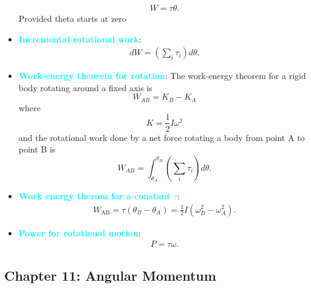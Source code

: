 \documentclass{report}
\begin{document}
\begin{itemize}
        \begin{align*}
            W = \tau\theta
        .\end{align*}
        Provided theta starts at zero
    \item \textbf{\textcolor{cyan}{Incremental rotational work}}:
        \begin{align*}
            dW = \left(\sum_i \tau_{i}\right)d\theta 
        .\end{align*}
    \item \textbf{\textcolor{cyan}{Work-energy theorem for rotation}}:
        The work-energy theorem for a rigid body rotating around a fixed axis is
        \[
            W_{AB} = K_B - K_A
        \]
        where
        \[
            K = \frac{1}{2}I\omega^2
        \]
        and the rotational work done by a net force rotating a body from point A to point B is
        \[
            W_{AB} = \int_{\theta_A}^{\theta_B} \left( \sum_{i} \tau_{i} \right) d\theta.
        \]
    \item \textbf{\textcolor{cyan}{Work energy therom for a constant $\tau$}}:
        \begin{align*}
            W_{\text{AB}} = \tau(\theta_{B} - \theta_{A}) = \frac{1}{2}I(\omega_{B}^{2} - \omega_{A}^{2})
        .\end{align*}
    \item \textbf{\textcolor{cyan}{Power for rotational motion}}:
        \begin{align*}
            P = \tau\omega
        .\end{align*}

    \end{itemize}

    \pagebreak 
    \subsection{Chapter 11: Angular Momentum}
    \bigbreak \noindent 
\end{document}

